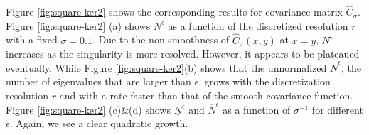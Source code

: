 \documentclass[11pt]{amsart}
\begin{document}
%

Figure \ref{fig:square-ker2} shows the corresponding results for covariance matrix $\hat{C}_{\sigma}$. Figure \ref{fig:square-ker2} (a) shows $\underline{N}^{\epsilon}$ as a function of the discretized resolution $r$ with a fixed $\sigma=0.1$. Due to the non-smoothness of $\hat{C}_{\sigma}(x,y)$ at $x=y$, $\underline{N}^{\epsilon}$ increases as the singularity is more resolved. However, it appears to be plateaued eventually.  While Figure \ref{fig:square-ker2}(b) shows that the unnormalized $\overline{N}^{\epsilon}$, the number of eigenvalues that are larger than $\epsilon$, grows with the discretization resolution $r$ and with a rate faster than that of the smooth covariance function. Figure \ref{fig:square-ker2} (c)\&(d) shows $\underline{N}^{\epsilon}$ and $\overline{N}^{\epsilon}$ as a function of $\sigma^{-1}$ for different $\epsilon$. Again, we see a clear quadratic growth. 
\end{document}
